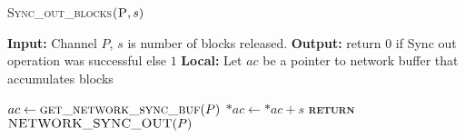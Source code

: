 \documentclass[10pt]{article}
\begin{document}
\begin{algorithm}{}
\footnotesize
\caption{\textsc{Sync\_out\_blocks}{$\textsc{(P}, s)$}}
\label{alg:Sync_out_blocks} 
\begin{algorithmic}[1]

\STATE \textbf{Input:} Channel $P$, $s$ is number of blocks released.
\STATE \textbf{Output:} return {$0$} if Sync out operation was successful else {$1$}
\STATE \textbf{Local:} Let $ac$ be a pointer to network buffer that accumulates blocks

\STATE \quad $\textbf{$ac$} \leftarrow  \textsc{get\_network\_sync\_buf}(P)$ 
\STATE \quad $\textbf{$*ac$} \leftarrow  \textbf{$*ac$} + s$ 
\STATE \textsc{\textbf{return}} {$\textsc{NETWORK\_SYNC\_OUT}(P)$}
\STATE


\end{algorithmic}
\end{algorithm}


\end{document}

